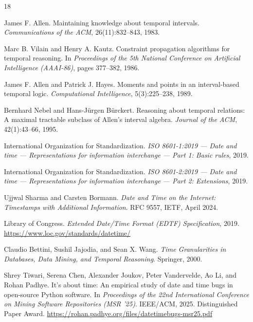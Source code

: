 \begin{thebibliography}{18}

  James F. Allen.
  \newblock Maintaining knowledge about temporal intervals.
  \newblock \emph{Communications of the ACM}, 26(11):832--843, 1983.
  \newblock {}

  Marc B. Vilain and Henry A. Kautz.
  \newblock Constraint propagation algorithms for temporal reasoning.
  \newblock In \emph{Proceedings of the 5th National Conference on
  Artificial Intelligence (AAAI-86)}, pages 377--382, 1986.

  James F. Allen and Patrick J. Hayes.
  \newblock Moments and points in an interval-based temporal logic.
  \newblock \emph{Computational Intelligence}, 5(3):225--238, 1989.
  \newblock {}

  Bernhard Nebel and Hans-J\"urgen B\"urckert.
  \newblock Reasoning about temporal relations: A maximal tractable
  subclass of Allen's interval algebra.
  \newblock \emph{Journal of the ACM}, 42(1):43--66, 1995.
  \newblock {}

  International Organization for Standardization.
  \newblock \emph{ISO 8601-1:2019 --- Date and time --- Representations
  for information interchange --- Part 1: Basic rules}, 2019.

  International Organization for Standardization.
  \newblock \emph{ISO 8601-2:2019 --- Date and time --- Representations
  for information interchange --- Part 2: Extensions}, 2019.

  Ujjwal Sharma and Carsten Bormann.
  \newblock \emph{Date and Time on the Internet: Timestamps with
  Additional Information}.
  \newblock RFC 9557, IETF, April 2024.
  \newblock {}

  Library of Congress.
  \newblock \emph{Extended Date/Time Format (EDTF) Specification}, 2019.
  \newblock \url{https://www.loc.gov/standards/datetime/}

  Claudio Bettini, Sushil Jajodia, and Sean X. Wang.
  \newblock \emph{Time Granularities in Databases, Data Mining, and
  Temporal Reasoning}.
  \newblock Springer, 2000.

  Shrey Tiwari, Serena Chen, Alexander Joukov, Peter Vandervelde,
  Ao Li, and Rohan Padhye.
  \newblock It's about time: An empirical study of date and time bugs
  in open-source Python software.
  \newblock In \emph{Proceedings of the 22nd International Conference
  on Mining Software Repositories (MSR '25)}. IEEE/ACM, 2025.
  \newblock Distinguished Paper Award.
  \newblock \url{https://rohan.padhye.org/files/datetimebugs-msr25.pdf}


\end{thebibliography}
